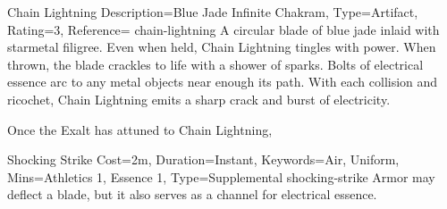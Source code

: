 \begin{Merit}{Chain Lightning}{%
    Description=Blue Jade Infinite Chakram,
    Type=Artifact,
    Rating=3,
    Reference=\cite*[p.~159]{ex3}
}{chain-lightning}
    A circular blade of blue jade inlaid with starmetal filigree. Even when
    held, Chain Lightning tingles with power. When thrown, the blade crackles
    to life with a shower of sparks. Bolts of electrical essence arc to any
    metal objects near enough its path. With each collision and ricochet, Chain
    Lightning emits a sharp crack and burst of electricity.



    Once the Exalt has attuned to Chain Lightning, 

    \begin{Charm}{Shocking Strike}{%
        Cost=2m,
        Duration=Instant,
        Keywords={Air, Uniform},
        Mins={Athletics 1, Essence 1},
        Type=Supplemental
    }{shocking-strike}
        Armor may deflect a blade, but it also serves as a channel for
        electrical essence. 
    \end{Charm}
\end{Merit}


